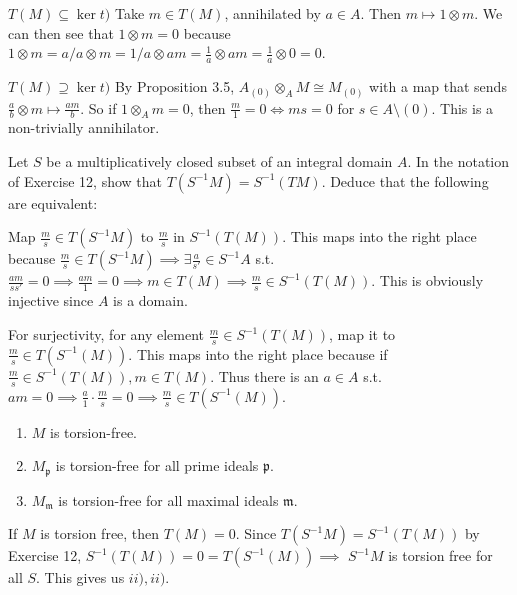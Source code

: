 \documentclass[a4paper]{exam}
\newif\ifhint
\begin{document}
\begin{questions}
\begin{enumerate}
\begin{solution}
		$T(M) \subseteq \ker t) $ Take $m \in T(M) $, annihilated by $a\in A$.
		Then $m\mapsto 1 \otimes m $.
		We can then see that $1 \otimes m = 0$ because $1 \otimes m = a / a \otimes m = 1 / a \otimes am = \frac{1}{a} \otimes am = \frac{1}{a} \otimes 0 = 0$.

		$T(M) \supseteq \ker t) $ By Proposition 3.5, $A_{(0)} \otimes_A M \cong M_{(0)} $ with a map that sends $\frac{a}{b} \otimes m \mapsto \frac{am}{b} $.
		So if $1 \otimes_A m = 0 $, then $\frac{m}{1} = 0 \iff ms = 0 $ for $s\in A\setminus (0) $.
		This is a non-trivially annihilator.
	\end{solution}
\end{enumerate}
\ifhint
	For $iv) $, show that $K $ may be regarded as the direct limit of its submodules $A\xi(\xi \in K) $; using Chapter 1, Exercise 15 and Exercise 20, show that if $1 \otimes x = 0 $ in $K \otimes M $ then $1 \otimes x = 0 $ in $A\xi \otimes M $ for some $\xi \ne 0 $ Deduce that $\xi ^{-1} x = 0 $
\fi

\question Let $S $ be a multiplicatively closed subset of an integral domain $A $. In the notation of Exercise 12, show that $T(S^{-1}M)= S^{-1}(TM) $. Deduce that the following are equivalent:
\begin{solution}
	Map $\frac{m}{s} \in T(S^{-1}M) $ to $\frac{m}{s} $ in $S^{-1}(T(M)) $.
	This maps into the right place because $\frac{m}{s} \in T(S^{-1}M) \implies \exists \frac{a}{s'}\in S^{-1}A$ s.t. $\frac{am}{ss'} = 0 \implies \frac{am}{1} = 0 \implies m \in T(M) \implies \frac{m}{s} \in S^{-1}(T(M))$.
	This is obviously injective since $A $ is a domain.

	For surjectivity, for any element $\frac{m}{s} \in S^{-1}(T(M)) $, map it to $\frac{m}{s} \in T(S^{-1}(M)) $.
	This maps into the right place because if $\frac{m}{s} \in S^{-1}(T(M)), m \in T(M) $.
	Thus there is an $a \in A $ s.t. $am = 0 \implies \frac{a}{1}\cdot \frac{m}{s} = 0 \implies \frac{m}{s} \in T(S^{-1}(M))$.
\end{solution}
\begin{enumerate}
	\item $M $ is torsion-free.
	\item $M_{\mathfrak{p}} $ is torsion-free for all prime ideals $\mathfrak{p} $.
	\item $M_{\mathfrak{m}} $ is torsion-free for all maximal ideals $\mathfrak{m} $.
\end{enumerate}
\begin{solution}
	If $M $ is torsion free, then $T(M) = 0 $.
	Since $T(S^{-1}M) = S^{-1}(T(M)) $ by Exercise 12, $S^{-1}(T(M)) = 0 = T(S^{-1}(M)) \implies $ $S^{-1}M $ is torsion free for all $S $.
	This gives us $ii),ii) $.


\end{solution}
\end{questions}
\end{document}
